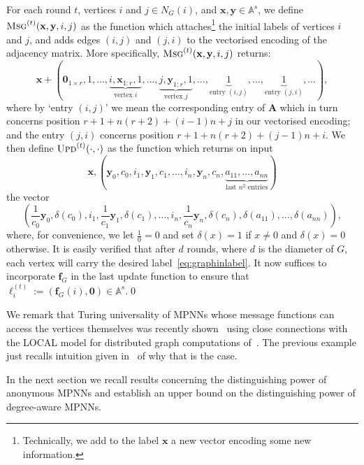 \begin{example}
For each round $t$, vertices $i$ and $j\in N_G(i)$, and $\mathbf{x},\mathbf{y}\in\mathbb{A}^s$, we define
$
\textsc{Msg}^{(t)}(\mathbf{x},\mathbf{y},i,j)
$
as the function which attaches\footnote{Technically, we add to the label
$\textbf{x}$ a new vector encoding some new information.} the initial labels of
vertices $i$ and $j$, and adds edges $(i,j)$ and $(j,i)$ to the vectorised
encoding of the adjacency matrix.  More specifically, $
\textsc{Msg}^{(t)}(\mathbf{x},\mathbf{y},i,j)
$ returns:
\[
\mathbf{x}+(\mathbf{0}_{1\times r},1,\ldots,\underbrace{i,\mathbf{x}_{1:r},1}_{\text{vertex $i$}},\ldots, \underbrace{j,\mathbf{y}_{1:r},1}_{\text{vertex $j$}},\ldots,\underbrace{1}_{\text{entry $(i,j)$}},\ldots,\underbrace{1}_{\text{entry $(j,i)$}},\ldots),
\]
where by `entry $(i,j)$' we mean the corresponding entry of $\mathbf{A}$ which in turn concerns position $r+1+n(r+2)+(i-1)n+j$ in our vectorised encoding;
and the entry $(j,i)$
concerns position $r+1+n(r+2)+(j-1)n+i$. We then define
$\textsc{Upd}^{(t)}(\cdot,\cdot)$ as the
function which returns on input 
\[
\mathbf{x}, \left(\mathbf{y}_0,c_0,i_1,\mathbf{y}_1,c_1,\ldots,i_n,\mathbf{y}_n,c_n, \underbrace{a_{11},\ldots,a_{nn}}_{\text{last $n^2$ entries}}\right)
\]
the vector
\[
\left(\frac{1}{c_0}\mathbf{y}_0,\delta(c_0),i_1,\frac{1}{c_1}\mathbf{y}_1,\delta(c_1),\ldots,
i_n,\frac{1}{c_n}\mathbf{y}_n,\delta(c_n),\delta(a_{11}),\ldots,\delta(a_{nn})\right),
\]
where, for convenience, we let $\frac{1}{0}=0$ and
set $\delta(x)=1$ if $x\neq 0$ and $\delta(x)=0$ otherwise. It is easily verified that after $d$ rounds, where $d$ is the diameter of $G$, each vertex will carry
the desired label~\eqref{eq:graphinlabel}. It now suffices to incorporate $\mathbf{f}_G$ in the last update function to ensure that $\pmb{\ell}_i^{(t)}:=(\mathbf{f}_G(i),\mathbf{0})\in\mathbb{A}^s$.\qed
\end{example}
We remark that Turing universality of MPNNs whose message functions can access
the vertices themselves was recently shown~\cite{Loukas2019} using close
connections with the LOCAL model for distributed graph computations
of~\cite{Angluin}. The previous example just recalls intuition given 
in~\cite{linial92} of why that is the case.

In the next section we recall results concerning the distinguishing power of anonymous MPNNs and establish an upper bound on the distinguishing power of degree-aware MPNNs.

